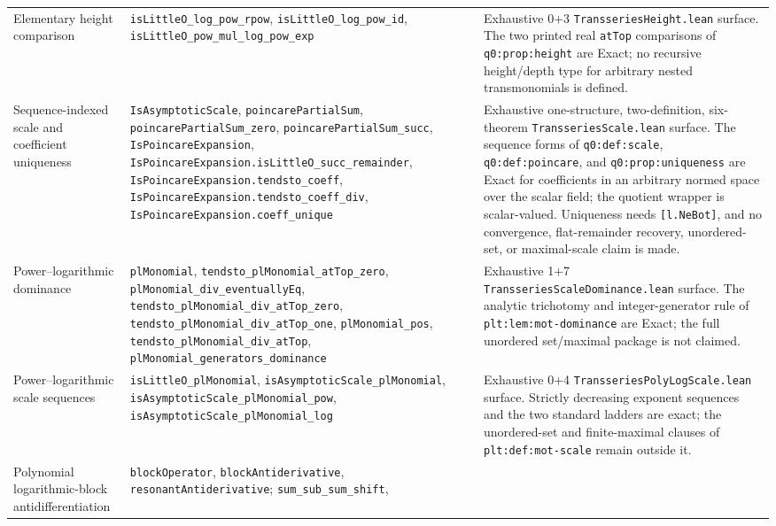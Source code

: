 \documentclass[11pt,oneside]{article}
\theoremstyle{definition}
\theoremstyle{remark}
\begin{document}
\begin{longtable}{@{}>{\raggedright\arraybackslash}p{} >{\raggedright\arraybackslash}p{} >{\raggedright\arraybackslash}p{}@{}}
Elementary height comparison &
\nolinkurl{isLittleO_log_pow_rpow}, \nolinkurl{isLittleO_log_pow_id},
\nolinkurl{isLittleO_pow_mul_log_pow_exp} & Exhaustive 0+3
\nolinkurl{TransseriesHeight.lean} surface.  The two printed real
\nolinkurl{atTop} comparisons of \nolinkurl{q0:prop:height} are Exact; no
recursive height/depth type for arbitrary nested transmonomials is defined. \\
Sequence-indexed scale and coefficient uniqueness &
\nolinkurl{IsAsymptoticScale}, \nolinkurl{poincarePartialSum},
\nolinkurl{poincarePartialSum_zero}, \nolinkurl{poincarePartialSum_succ},
\nolinkurl{IsPoincareExpansion},
\nolinkurl{IsPoincareExpansion.isLittleO_succ_remainder},
\nolinkurl{IsPoincareExpansion.tendsto_coeff},
\nolinkurl{IsPoincareExpansion.tendsto_coeff_div},
\nolinkurl{IsPoincareExpansion.coeff_unique} & Exhaustive one-structure,
two-definition, six-theorem \nolinkurl{TransseriesScale.lean} surface.
The sequence forms of \nolinkurl{q0:def:scale}, \nolinkurl{q0:def:poincare},
and \nolinkurl{q0:prop:uniqueness} are Exact for coefficients in an arbitrary
normed space over the scalar field; the quotient wrapper is scalar-valued.
Uniqueness needs \nolinkurl{[l.NeBot]}, and no convergence, flat-remainder
recovery, unordered-set, or maximal-scale claim is made. \\
Power--logarithmic dominance &
\nolinkurl{plMonomial}, \nolinkurl{tendsto_plMonomial_atTop_zero},
\nolinkurl{plMonomial_div_eventuallyEq},
\nolinkurl{tendsto_plMonomial_div_atTop_zero},
\nolinkurl{tendsto_plMonomial_div_atTop_one}, \nolinkurl{plMonomial_pos},
\nolinkurl{tendsto_plMonomial_div_atTop},
\nolinkurl{plMonomial_generators_dominance} & Exhaustive 1+7
\nolinkurl{TransseriesScaleDominance.lean} surface.  The analytic trichotomy
and integer-generator rule of \nolinkurl{plt:lem:mot-dominance} are Exact;
the full unordered set/maximal package is not claimed. \\
Power--logarithmic scale sequences &
\nolinkurl{isLittleO_plMonomial},
\nolinkurl{isAsymptoticScale_plMonomial},
\nolinkurl{isAsymptoticScale_plMonomial_pow},
\nolinkurl{isAsymptoticScale_plMonomial_log} & Exhaustive 0+4
\nolinkurl{TransseriesPolyLogScale.lean} surface.  Strictly decreasing exponent
sequences and the two standard ladders are exact; the unordered-set and
finite-maximal clauses of \nolinkurl{plt:def:mot-scale} remain outside it. \\
Polynomial logarithmic-block antidifferentiation &
\nolinkurl{blockOperator}, \nolinkurl{blockAntiderivative},
\nolinkurl{resonantAntiderivative}; \nolinkurl{sum_sub_sum_shift},

\end{longtable}
\end{document}
